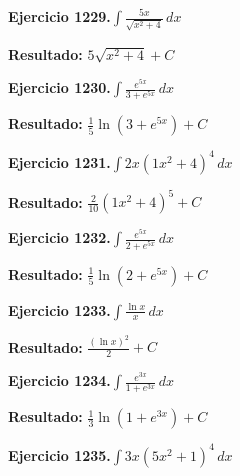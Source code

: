 \documentclass[10pt,a4paper]{article}
\begin{document}
\begin{ejbox}
\textbf{Ejercicio 1229.}\quad $\int \frac{5x}{\sqrt{x^2+4}}\,dx$
\end{ejbox}

\begin{solbox}
\textbf{Resultado:} \(\displaystyle 5\sqrt{x^2+4} + C\)
\end{solbox}

\begin{ejbox}
\textbf{Ejercicio 1230.}\quad $\int \frac{e^{5x}}{3+e^{5x}}\,dx$
\end{ejbox}

\begin{solbox}
\textbf{Resultado:} \(\displaystyle \frac{1}{5}\ln(3+e^{5x}) + C\)
\end{solbox}

\newpage
\begin{ejbox}
\textbf{Ejercicio 1231.}\quad $\int 2x(1x^2 + 4)^{4}\,dx$
\end{ejbox}

\begin{solbox}
\textbf{Resultado:} \(\displaystyle \frac{2}{10}(1x^2+4)^{5} + C\)
\end{solbox}

\begin{ejbox}
\textbf{Ejercicio 1232.}\quad $\int \frac{e^{5x}}{2+e^{5x}}\,dx$
\end{ejbox}

\begin{solbox}
\textbf{Resultado:} \(\displaystyle \frac{1}{5}\ln(2+e^{5x}) + C\)
\end{solbox}

\begin{ejbox}
\textbf{Ejercicio 1233.}\quad $\int \frac{\ln x}{x}\,dx$
\end{ejbox}

\begin{solbox}
\textbf{Resultado:} \(\displaystyle \frac{(\ln x)^2}{2} + C\)
\end{solbox}

\newpage
\begin{ejbox}
\textbf{Ejercicio 1234.}\quad $\int \frac{e^{3x}}{1+e^{3x}}\,dx$
\end{ejbox}

\begin{solbox}
\textbf{Resultado:} \(\displaystyle \frac{1}{3}\ln(1+e^{3x}) + C\)
\end{solbox}

\begin{ejbox}
\textbf{Ejercicio 1235.}\quad $\int 3x(5x^2 + 1)^{4}\,dx$
\end{ejbox}
\end{document}
